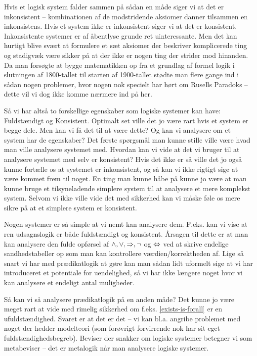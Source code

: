 Hvis et logisk system falder sammen på sådan en måde siger vi at det er inkonsistent --
kombinationen af de modstridende aksiomer danner tilsammen en inkonsistens.
Hvis et system ikke er inkonsistent siger vi at det er konsistent.
Inkonsistente systemer er af åbentlyse grunde ret uinteressante.
Men det kan hurtigt blive svært at formulere et sæt aksiomer der beskriver komplicerede ting
og stadigvæk være sikker på at der ikke er nogen ting der strider mod hinanden.
Da man forsøgte at bygge matematikken op fra et grundlag af formel logik i slutningen
af 1800-tallet til starten af 1900-tallet stødte man flere gange ind i sådan nogen problemer,
hvor nogen nok specielt har hørt om Rusells Paradoks -- dette vil vi dog ikke komme nærmere
ind på her.

Så vi har altså to forskellige egenskaber som logiske systemer kan have: Fuldstændigt og Konsistent.
Optimalt set ville det jo være rart hvis et system er begge dele.
Men kan vi få det til at være dette? Og kan vi analysere om et system har de egenskaber?
Det første spørgsmål man kunne stille ville være hvad man ville analysere systemet med. Hvordan kan vi vide at det
vi bruger til at analysere systemet med selv er konsistent? Hvis det ikke er så ville det jo også kunne fortælle
os at systemet er inkonsistent, og så kan vi ikke rigtigt sige at være kommet frem til noget.
En ting man kunne håbe på kunne jo være at man kunne bruge et tilsyneladende simplere system til at analysere et mere komplekst system.
Selvom vi ikke ville vide det med sikkerhed kan vi måske føle os mere sikre på at et simplere system er konsistent.

Nogen systemer er så simple at vi nemt kan analysere dem. F.eks. kan vi vise at ren udsagnslogik er både fuldstændigt og konsistent.
Årsagen til dette er at man kan analysere den fulde opførsel af $\land,\lor,\Rightarrow,\neg$ og $\Leftrightarrow$ ved at skrive endelige sandhedstabeller op som man
kan kontrollere værdien/korrektheden af. Lige så snart vi har med prædikatlogik at gøre kan man sådan lidt uformelt sige at vi
har introduceret et potentiale for uendelighed, så vi har ikke længere noget hvor vi kan analysere et endeligt antal muligheder.

Så kan vi så analysere prædikatlogik på en anden måde? Det kunne jo være meget rart at vide med rimelig sikkerhed om 
f.eks. \eqref{exists-is-forall} er en ufuldstændighed. Svaret er at det er det -- vi kan bl.a. angribe problemet med
noget der hedder modelteori (som forøvrigt forvirrende nok har sit eget fuldstændighedsbegreb). Beviser der snakker
om logiske systemer betegner vi som metabeviser -- det er metalogik når man analysere logiske systemer.


